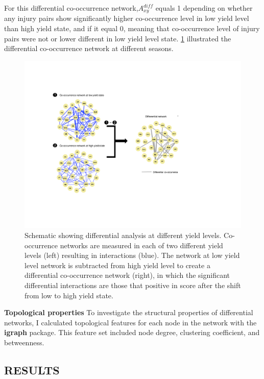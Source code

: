 For  this differential co-occurrence network,$A_{xy}^{diff}$ equals 1 depending on whether any injury pairs show significantly higher co-occurrence level in low yield level than high yield state, and if it equal 0, meaning that co-occurrence level of injury pairs were not or lower different in low yield level state. \ref{fig:pipeline4} illustrated the differential co-occurrence network at different seasons.

\begin{figure}[h]
\centering
\includegraphics[width = 1\textwidth]{figures/pipeline4.pdf}
\caption[Differential analysis of crop health survey data at different yield levels]{Schematic showing differential analysis at different yield levels. Co-occurrence networks are measured in each of two different yield levels (left) resulting in interactions (blue). The network at low yield level network is subtracted from high yield level to create a differential co-occurrence network (right), in which the significant differential interactions are those that positive in score after the shift from low to high yield state.}
\label{fig:pipeline4}
\end{figure} 

\textbf{Topological properties}
To investigate the structural properties of differential networks, I calculated topological features for each node in the network with the \textbf{igraph} package. This feature set included node degree, clustering coefficient, and betweenness. 


\clearpage
\subsection{RESULTS}

